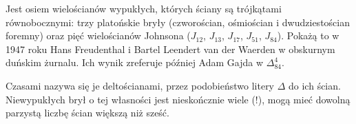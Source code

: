 Jest osiem wielościanów wypukłych, których ściany są trójkątami równobocznymi: trzy platońskie bryły (czworościan, ośmiościan i dwudziestościan foremny) oraz pięć wielościanów Johnsona ($J_{12}$, $J_{13}$, $J_{17}$, $J_{51}$, $J_{84}$).
Pokażą to w 1947 roku Hans Freudenthal i Bartel Leendert van der Waerden \cite{Freudenthal_1947} w obskurnym duńskim żurnalu.
Ich wynik zreferuje później Adam Gajda w $\Delta_{84}^{4}$.

Czasami nazywa się je deltościanami, przez podobieństwo litery $\Delta$ do ich ścian.
Niewypukłych brył o tej własności jest nieskończnie wiele (!), mogą mieć dowolną parzystą liczbę ścian większą niż sześć.

